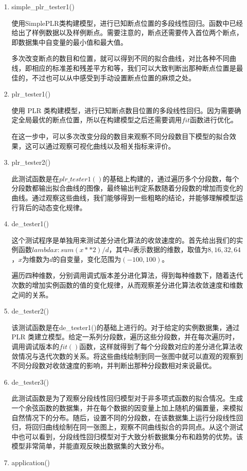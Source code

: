 \begin{enumerate}[(1)]
    \item simple\_plr\_tester1()
    
    使用SimplePLR类构建模型，进行已知断点位置的多段线性回归。函数中已经给出了样例数据以及样例断点。需要注意的，断点还需要传入首位两个断点，即数据集中自变量的最小值和最大值。

    多次改变断点的数目和位置，就可以得到不同的拟合曲线，对比各种不同曲线，即相应的标准差和残差平方和等，我们可以大致判断出那种断点位置是最佳的，不过也可以从中感受到手动设置断点位置的麻烦之处。
    \item plr\_tester1()
    
    使用 PLR 类构建模型，进行已知断点数目位置的多段线性回归。因为需要确定全局最优的断点位置，所以在构建模型之后还需要调用$fit$函数进行优化。

    在这一步中，可以多次改变分段的数目来观察不同分段数目下模型的拟合效果，这可以通过观察可视化曲线以及相关指标来评价。
    \item plr\_tester2()
    
    此测试函数是在$plr\_tester1()$的基础上构建的，通过遍历多个分段数，每个分段数都输出拟合曲线的图像，最终输出判定系数随着分段数的增加而变化的曲线。通过观察这些曲线，我们能够得到一些粗略的结论，并能够理解模型运行背后的动态变化规律。
    \item de\_tester1()
    
    这个测试程序是单独用来测试差分进化算法的收敛速度的。首先给出我们的实例函数$lambda x: sum(x ** 2) / d$，其中$d$表示数据的维数，取值为$8,16,32,64$，$x$为维数为$d$的自变量，变化范围为$(-100,100)$。

    遍历四种维数，分别调用调式版本差分进化算法，得到每种维数下，随着迭代次数的增加实例函数的值的变化规律，从而观察差分进化算法收敛速度和维数之间的关系。
    \item de\_tester2()
    
    该测试函数是在de\_tester1()的基础上进行的。对于给定的实例数据集，通过 PLR 类建立模型。给定一系列分段数，遍历这些分段数，并在每次遍历时，调用调试版本的$fit()$函数，这样就得到了每个分段数对应的差分进化算法收敛情况与迭代次数的关系。将这些曲线绘制到同一张图中就可以直观的观察到不同分段数对收敛速度的影响，并判断出那种分段数相对来说最优。
    \item de\_tester3()
    
    此测试函数是为了观察分段线性回归模型对于非多项式函数的拟合情况。生成一个余弦函数的数据集，并在每个数据的因变量上加上随机的偏置量，来模拟自然情况下的分布。随后，设置不同的分段数，在该数据集上运行分段线性回归，将回归曲线绘制在同一张图上，观察不同曲线拟合的异同点。从这个测试中也可以看到，分段线性回归模型对于大致分析数据集分布和趋势的优势。该模型非常简单，并能直观反映出数据集的大致分布。
    \item application()
    

\end{enumerate}
